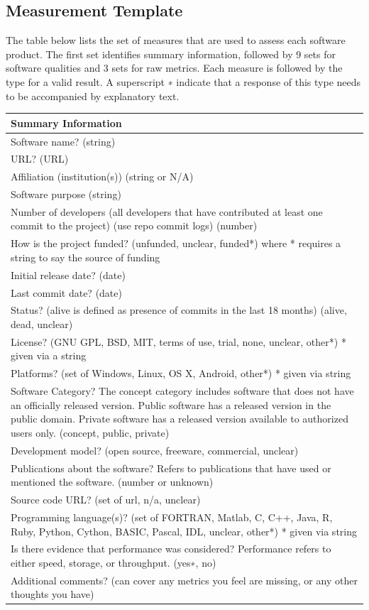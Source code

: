 \documentclass[12pt, notitlepage]{article}
\begin{document}
\begin{singlespace}
\newpage

\subsection{Measurement Template}
The table below lists the set of measures that are used to assess each software product. The first set identifies summary information, followed by 9 sets for software qualities and 3 sets for raw metrics. Each measure is followed by the type for a valid result. A superscript ∗ indicate that a response of this type needs to be accompanied by explanatory text. 

\label{measurementtemplate}
\def\arraystretch{1.22}
\begin{tabular}{p{16cm}}
		\hline
		\textbf{Summary Information}\\
		\hline
		Software name? (string)\\
		URL? (URL)\\
		Affiliation (institution(s)) (string or {N/A})\\
		Software purpose (string)\\
		Number of developers (all developers that have contributed at least one commit to the project) (use repo commit logs) (number)\\
		How is the project funded? (unfunded, unclear, funded*) where * requires a string to say the source of funding\\
		Initial release date? (date)\\
		Last commit date? (date)\\
		Status? (alive is defined as presence of commits in the last 18 months) ({alive, dead, unclear})\\
		License? ({GNU GPL, BSD, MIT, terms of use, trial, none, unclear, other*}) * given via a string \\
		Platforms? (set of {Windows, Linux, OS X, Android, other*}) * given via string\\
		Software Category? The concept category includes software that does not have an officially released version. Public software has a released version in the public domain. Private software has a released version available to authorized users only. ({concept, public, private})\\
		Development model? ({open source, freeware, commercial, unclear})\\
		Publications about the software? Refers to publications that have used or mentioned the software. (number or {unknown})\\
		Source code URL? ({set of url, n/a, unclear})\\
		Programming language(s)? (set of {FORTRAN, Matlab, C, C++, Java, R, Ruby, Python, Cython, BASIC, Pascal, IDL, unclear, other*}) * given via string \\
		Is there evidence that performance was considered? Performance refers to either speed, storage, or throughput. ({yes∗, no})\\
		Additional comments? (can cover any metrics you feel are missing, or any other thoughts you have) \\
		\hline
\end{tabular}


\end{singlespace}
\end{document}
